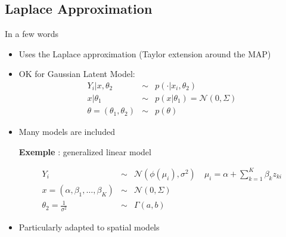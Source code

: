   
  \subsection{Laplace Approximation}

  
  \begin{frame}{In a few words}
   
   
   \begin{itemize}
    \item Uses the  Laplace approximation  (Taylor extension around the MAP)
    \item OK for Gaussian Latent Model:
    \begin{eqnarray*}
     Y_i | x, \theta_2 &\sim& p(\cdot | x_i, \theta_2)\\
     x | \theta_1  &\sim& p(x | \theta_1) = \mathcal{N}(0,\Sigma)\\
     \theta = (\theta_1,\theta_2) &\sim& p(\theta)
    \end{eqnarray*}
  
  \item Many models are included
  
  \textbf{Exemple} : generalized linear model
 
 \begin{eqnarray*}
  Y_i &\sim& \mathcal{N}(\phi(\mu_i), \sigma^2)\quad   \mu_i = \alpha + \sum_{k=1}^K\beta_k z_{ki} \\
  x  = (\alpha,\beta_1, \dots,\beta_K) &\sim& \mathcal{N}(0,\Sigma)\\
  \theta_2   = \frac{1}{\sigma^2} &\sim&  \Gamma(a,b)
  \end{eqnarray*}
 
    
\item Particularly adapted to spatial models    
   \end{itemize}

   
  \end{frame}

